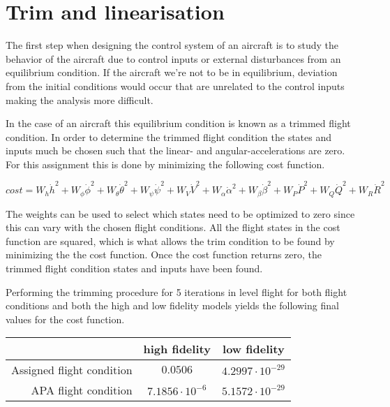 \section{Trim and linearisation}
The first step when designing the control system of an aircraft is to study the behavior of the aircraft due to control inputs or external disturbances from an equilibrium condition. If the aircraft we're not to be in equilibrium, deviation from the initial conditions would occur that are unrelated to the control inputs making the analysis more difficult.

In the case of an aircraft this equilibrium condition is known as a trimmed flight condition. In order to determine the trimmed flight condition the states and inputs much be chosen such that the linear- and angular-accelerations are zero. For this assignment this is done by minimizing the following cost function.

\begin{equation}
    \label{eq:trim_cost}
    cost = W_{h}\dot{h}^2 + 
           W_{\phi}\dot{\phi}^2 +
           W_{\theta}\dot{\theta}^2 + 
           W_{\psi}\dot{\psi}^2 +
           W_{V}\dot{V}^2 + 
           W_{\alpha}\dot{\alpha}^2 + 
           W_{\beta}\dot{\beta}^2 + 
           W_{P}\dot{P}^2 +
           W_{Q}\dot{Q}^2 +
           W_{R}\dot{R}^2
\end{equation}

The weights can be used to select which states need to be optimized to zero since this can vary with the chosen flight conditions. All the flight states in the cost function are squared, which is what allows the trim condition to be found by minimizing the the cost function. Once the cost function returns zero, the trimmed flight condition states and inputs have been found.

Performing the trimming procedure for 5 iterations in level flight for both flight conditions and both the high and low fidelity models yields the following final values for the cost function.

\begin{center}
    \begin{tabular}{ r | c | c }
                               & high fidelity & low fidelity \\ \hline \hline
     Assigned flight condition & $0.0506$ & $4.2997\cdot10^{-29}$ \\  
     APA flight condition      & $7.1856\cdot10^{-6}$ & $5.1572\cdot10^{-29}$    
    \end{tabular}
\end{center}
